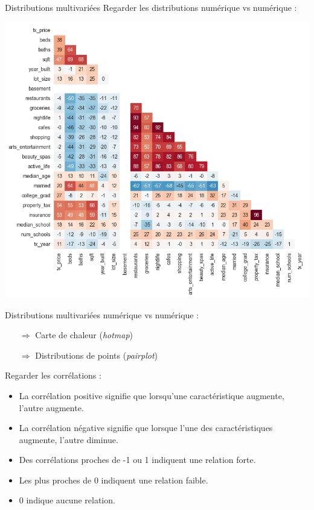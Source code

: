 \documentclass[french]{beamer}
\begin{document}
\begin{frame}{Distributions multivariées}
Regarder les distributions numérique vs numérique : 
\begin{center}
	\includegraphics[height=0.8\textheight]{corr}
\end{center}
\end{frame}

\begin{frame}{Distributions multivariées}
numérique vs numérique : 
\begin{itemize}
	\item[$\Rightarrow$] Carte de chaleur (\emph{hotmap})
	\item[$\Rightarrow$] Distributions de points (\emph{pairplot})
\end{itemize}

Regarder les corrélations : 
\begin{itemize}
	\item La corrélation positive signifie que lorsqu'une caractéristique augmente, l'autre augmente.
	\item La corrélation négative signifie que lorsque l'une des caractéristiques augmente, l'autre diminue.
	\item Des corrélations proches de -1 ou 1 indiquent une relation forte.
	\item Les plus proches de 0 indiquent une relation faible. 
	\item 0 indique aucune relation.
\end{itemize}
\end{frame}
\end{document}
